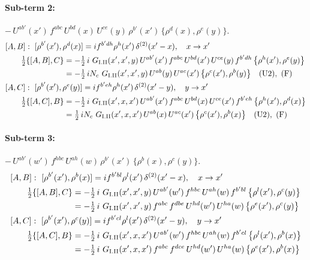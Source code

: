 \documentclass[10pt]{article}
\numberwithin{equation}{section}
\begin{document}
\paragraph{Sub-term 2:} $-\,U^{ab'}(x')\,f^{abc}\,U^{bd}(x)\,U^{ce}(y)\,\rho^{b'}(x')\,\big\{\rho^{d}(x),\rho^{e}(y)\big\}$.
\begin{align}
&[A,B]:\ [\rho^{b'}(x'),\rho^{d}(x)]=i f^{b'dh}\rho^{h}(x')\,\delta^{(2)}(x'-x),\quad x\to x'\notag\\
&\qquad \tfrac12\{[A,B],C\}=-\tfrac12\,i\,\,G_{\rm I.II}(x',x',y)\,U^{ab'}(x')\,f^{abc}\,U^{bd}(x')\,U^{ce}(y)\,f^{b'dh}\,\big\{\rho^{h}(x'),\rho^{e}(y)\big\}\notag\\
&\qquad\phantom{\tfrac12\{[A,B],C\}}=-\tfrac12\,i N_{c}\,\,G_{\rm I.II}(x',x',y)\,U^{ab}(y)\,U^{ac}(x')\,\big\{\rho^{c}(x'),\rho^{b}(y)\big\}\quad\text{(U2)},\ \text{(F)}
\label{eq:GI.II-2-AB}\\
&[A,C]:\ [\rho^{b'}(x'),\rho^{e}(y)]=i f^{b'eh}\rho^{h}(x')\,\delta^{(2)}(x'-y),\quad y\to x'\notag\\
&\qquad \tfrac12\{[A,C],B\}=-\tfrac12\,i\,\,G_{\rm I.II}(x',x,x')\,U^{ab'}(x')\,f^{abc}\,U^{bd}(x)\,U^{ce}(x')\,f^{b'eh}\,\big\{\rho^{h}(x'),\rho^{d}(x)\big\}\notag\\
&\qquad\phantom{\tfrac12\{[A,C],B\}}=\tfrac12\,i N_{c}\,\,G_{\rm I.II}(x',x,x')\,U^{ab}(x)\,U^{ac}(x')\,\big\{\rho^{c}(x'),\rho^{b}(x)\big\}\quad\text{(U2)},\ \text{(F)}
\label{eq:GI.II-2-AC}
\end{align}
\paragraph{Sub-term 3:} $-\,U^{ab'}(w')\,f^{hbc}\,U^{ah}(w)\,\rho^{b'}(x')\,\big\{\rho^{b}(x),\rho^{c}(y)\big\}$.
\begin{align}
&[A,B]:\ [\rho^{b'}(x'),\rho^{b}(x)]=i f^{b'bl}\rho^{l}(x')\,\delta^{(2)}(x'-x),\quad x\to x'\notag\\
&\qquad \tfrac12\{[A,B],C\}=-\tfrac12\,i\,\,G_{\rm I.II}(x',x',y)\,U^{ab'}(w')\,f^{hbc}\,U^{ah}(w)\,f^{b'bl}\,\big\{\rho^{l}(x'),\rho^{c}(y)\big\}\notag\\
&\qquad\phantom{\tfrac12\{[A,B],C\}}=-\tfrac12\,i\,\,G_{\rm I.II}(x',x',y)\,f^{abc}\,f^{dbe}\,U^{hd}(w')\,U^{ha}(w)\,\big\{\rho^{e}(x'),\rho^{c}(y)\big\}
\label{eq:GI.II-3-AB}\\
&[A,C]:\ [\rho^{b'}(x'),\rho^{c}(y)]=i f^{b'cl}\rho^{l}(x')\,\delta^{(2)}(x'-y),\quad y\to x'\notag\\
&\qquad \tfrac12\{[A,C],B\}=-\tfrac12\,i\,\,G_{\rm I.II}(x',x,x')\,U^{ab'}(w')\,f^{hbc}\,U^{ah}(w)\,f^{b'cl}\,\big\{\rho^{l}(x'),\rho^{b}(x)\big\}\notag\\
&\qquad\phantom{\tfrac12\{[A,C],B\}}=-\tfrac12\,i\,\,G_{\rm I.II}(x',x,x')\,f^{abc}\,f^{dce}\,U^{hd}(w')\,U^{ha}(w)\,\big\{\rho^{e}(x'),\rho^{b}(x)\big\}
\label{eq:GI.II-3-AC}
\end{align}
\end{document}
